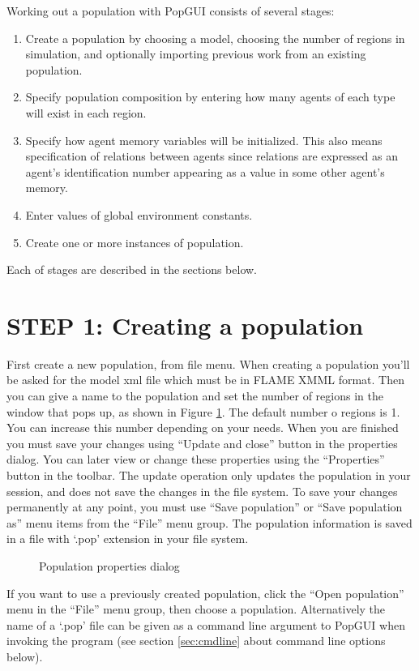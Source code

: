 Working out a population with PopGUI consists of several stages:
\begin{enumerate}
\item Create a population by choosing a model, choosing the number of regions in simulation, and optionally importing previous work from an existing population.
\item Specify population composition by entering how many agents of each type will exist in each region.
\item Specify how agent memory variables will be initialized. This also means specification of relations between agents since relations are expressed as an agent's identification number appearing as a value in some other agent's memory.
\item Enter values of global environment constants.
\item Create one or more instances of population.
\end{enumerate}
Each of stages are described in the sections below.

\section{STEP 1: Creating a population}
First create a new population, from file menu. When creating a population you'll be asked for the model xml file which must be in FLAME XMML format. Then you can give a name to the population and set the number of regions in the window that pops up, as shown in Figure \ref{fig:properties}. The default number o regions is 1. You can increase this number depending on your needs. When you are finished you must save your changes using ``Update and close'' button in the properties dialog. You can later view or change these properties using the ``Properties'' button in the toolbar. The update operation only updates the population in your session, and does not save the changes in the file system. To save your changes permanently at any point, you must use ``Save population'' or ``Save population as'' menu items from the ``File'' menu group. The population information is saved in a file with `.pop' extension in your file system.
\begin{figure}
\caption{Population properties dialog}
\label{fig:properties}
\end{figure}
If you want to use a previously created population, click the ``Open population'' menu in the ``File'' menu group, then choose a population. Alternatively the name of a `.pop' file can be given as a command line argument to PopGUI when invoking the program (see section \ref{sec:cmdline} about command line options below).

